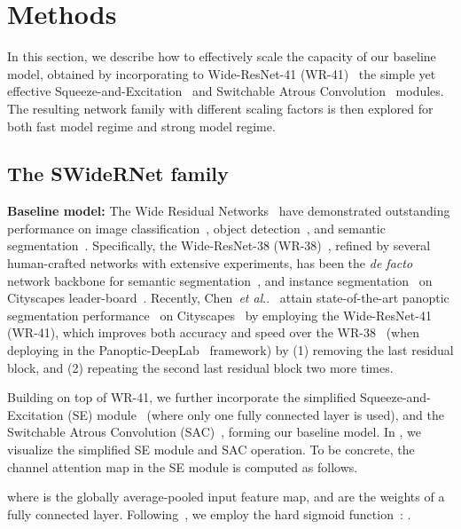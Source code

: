 \documentclass[final]{cvpr}
\makeatletter
\DeclareRobustCommand\onedot{\futurelet\@let@token\@onedot}
\def\@onedot{\ifx\@let@token.\else.\null\fi\xspace}
\def\etal{\emph{et al}\onedot}
\makeatother
\begin{document}
 \section{Methods}
\label{sec:methods}
In this section, we describe how to effectively scale the capacity of our baseline model, obtained by incorporating to Wide-ResNet-41 (WR-41)~\cite{wrn2016wide,wu2019wider,chen2020naive} the simple yet effective Squeeze-and-Excitation~\cite{hu2018squeeze} and Switchable Atrous Convolution~\cite{qiao2020detectors} modules. The resulting network family with different scaling factors is then explored for both fast model regime and strong model regime.

\subsection{The SWideRNet family}
{\bf Baseline model:} The Wide Residual Networks~\cite{wrn2016wide,wu2019wider} have demonstrated outstanding performance on image classification~\cite{ILSVRC15}, object detection~\cite{lin2014microsoft}, and semantic segmentation~\cite{everingham2010pascal}. Specifically, the Wide-ResNet-38 (WR-38)~\cite{wu2019wider}, refined by several human-crafted networks with extensive experiments, has been the {\it de facto} network backbone for semantic segmentation~\cite{neuhold2017mapillary,rota2018place,zhu2019improving,takikawa2019gated,li2020improving}, and instance segmentation~\cite{liang2019polytransform,homayounfar2020levelset} on Cityscapes leader-board~\cite{cordts2016cityscapes}. Recently, Chen~\etal~\cite{chen2020naive} attain state-of-the-art panoptic segmentation performance~\cite{kirillov2018panoptic} on Cityscapes~\cite{cordts2016cityscapes} by employing the Wide-ResNet-41 (WR-41), which improves both accuracy and speed over the WR-38~\cite{wu2019wider} (when deploying in the Panoptic-DeepLab~\cite{cheng2019panoptic} framework) by (1) removing the last residual block, and (2) repeating the second last residual block two more times.

Building on top of WR-41, we further incorporate the simplified Squeeze-and-Excitation (SE) module~\cite{hu2018squeeze,lee2020centermask} (where only one fully connected layer is used), and the Switchable Atrous Convolution (SAC)~\cite{qiao2020detectors}, forming our baseline model. In  , we visualize the simplified SE module and SAC operation. To be concrete, the channel attention map  in the SE module is computed as follows.

where  is the globally average-pooled input feature map, and  are the weights of a fully connected layer. Following~\cite{howard2019searching}, we employ the hard sigmoid function~\cite{binaryconnect}: .
\end{document}
